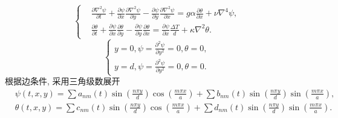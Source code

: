 \documentclass[12pt]{ctexart}
\begin{document}
\begin{equation}
	\left\{\begin{aligned}
		 & \frac{\partial \nabla^{2} \psi}{\partial t}+\frac{\partial \psi}{\partial x} \frac{\partial \nabla^{2} \psi}{\partial y}-\frac{\partial \psi}{\partial y} \frac{\partial \nabla^{2} \psi}{\partial x}=g \alpha{\frac{\partial \theta}{\partial x}}+ \nu \nabla^{4} \psi, \\
		 & \frac{\partial \theta}{\partial t}+\frac{\partial \psi}{\partial x} \frac{\partial \theta}{\partial y}-\frac{\partial \psi}{\partial y} \frac{\partial \theta}{\partial x} = \frac{\partial \psi}{\partial x} \frac{\Delta T}{d}+\kappa \nabla^{2} \theta.
	\end{aligned}\right.
	\label{eq:31}
\end{equation}
\begin{equation}
	\left\{\begin{array}{l}
		y=0, \psi=\frac{\partial^{2} \psi}{\partial y^{2}}=0, \theta=0, \\
		y=d, \psi=\frac{\partial^{2} \psi}{\partial y^{2}}=0, \theta=0.
	\end{array}\right.
\end{equation}
根据边条件, 采用三角级数展开
\begin{equation}
	\begin{aligned}
		 & \psi(t, x, y)=\sum a_{n m}(t) \sin \left(\frac{n \pi y}{d}\right) \cos \left(\frac{m \pi x}{a}\right)+\sum b_{n m}(t) \sin \left(\frac{n \pi y}{d}\right) \sin \left(\frac{m \pi x}{a}\right),   \\
		 & \theta(t, x, y)=\sum c_{n m}(t) \sin \left(\frac{n \pi y}{d}\right) \cos \left(\frac{m \pi x}{a}\right)+\sum d_{n m}(t) \sin \left(\frac{n \pi y}{d}\right) \sin \left(\frac{m \pi x}{a}\right).
	\end{aligned}
	\label{eq:32}
\end{equation}
\end{document}
